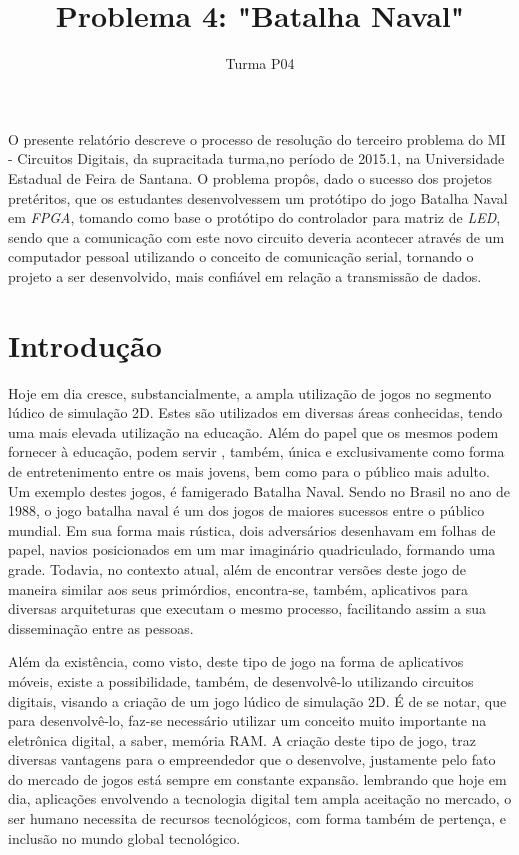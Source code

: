 \documentclass[12pt]{article}
\title{Problema 4: "Batalha Naval"}
\author{Turma P04}
\begin{document}
 

\maketitle

\begin{resumo} 
O presente relatório descreve o processo de resolução do terceiro problema do MI - Circuitos Digitais, da supracitada turma,no período de 2015.1, na Universidade Estadual de Feira de Santana. O problema propôs, dado o sucesso dos projetos pretéritos, que os estudantes desenvolvessem um protótipo do jogo Batalha Naval em \textit{FPGA}, tomando como base o  protótipo do controlador para matriz de \textit{LED}, sendo que a comunicação com este novo circuito deveria acontecer através de um computador pessoal utilizando o conceito de comunicação serial, tornando o projeto a ser desenvolvido, mais confiável em relação a transmissão de dados.
\end{resumo}

\section{Introdução} \label{sec:firstpage}

Hoje em dia cresce, substancialmente, a ampla utilização de jogos no segmento lúdico de simulação 2D. Estes são utilizados em diversas áreas conhecidas, tendo uma mais elevada utilização na educação. Além do papel que os mesmos podem fornecer à educação, podem servir , também, única e exclusivamente como forma de entretenimento entre os mais jovens, bem como para o público mais adulto. Um exemplo destes jogos, é famigerado Batalha Naval. Sendo no Brasil no ano de 1988, o jogo batalha naval é um dos jogos de maiores sucessos entre o público mundial. Em sua forma mais rústica, dois adversários desenhavam em folhas de papel, navios posicionados em um mar imaginário quadriculado, formando uma grade. Todavia, no contexto atual, além de encontrar versões deste jogo de maneira similar aos seus primórdios, encontra-se, também, aplicativos para diversas arquiteturas que executam o mesmo processo, facilitando assim a sua disseminação entre as pessoas.

Além da existência, como visto, deste tipo de jogo na forma de aplicativos móveis, existe a possibilidade, também, de desenvolvê-lo utilizando circuitos digitais, visando a criação de um jogo lúdico de simulação 2D.  É de se notar, que para desenvolvê-lo, faz-se necessário utilizar um conceito muito importante na eletrônica digital, a saber, memória RAM. A criação deste tipo de jogo, traz diversas vantagens para o empreendedor que o desenvolve, justamente pelo fato do mercado de jogos está sempre em constante expansão. lembrando que hoje em dia, aplicações envolvendo a tecnologia digital tem ampla aceitação no mercado, o ser humano necessita de recursos tecnológicos, com forma também de pertença, e inclusão no mundo global tecnológico. 
\end{document}

